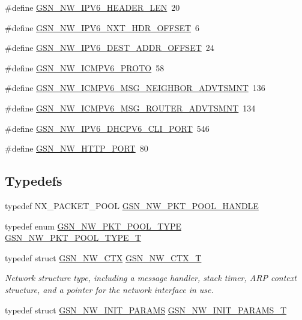 \begin{DoxyCompactItemize}
\#define \hyperlink{a00532_ad2c6776a539c7076331f15008f5a9969}{GSN\_\-NW\_\-IPV6\_\-HEADER\_\-LEN}~20
\item 
\#define \hyperlink{a00532_a0a016de722e22e498dadfba1abaa4bc3}{GSN\_\-NW\_\-IPV6\_\-NXT\_\-HDR\_\-OFFSET}~6
\item 
\#define \hyperlink{a00532_ab5593226f9c55aedd8d3c609b37fc253}{GSN\_\-NW\_\-IPV6\_\-DEST\_\-ADDR\_\-OFFSET}~24
\item 
\#define \hyperlink{a00532_aa45655995857c7f814122d96de2edf55}{GSN\_\-NW\_\-ICMPV6\_\-PROTO}~58
\item 
\#define \hyperlink{a00532_aa0aa9e2bbc754e9b936e74bf3ca029da}{GSN\_\-NW\_\-ICMPV6\_\-MSG\_\-NEIGHBOR\_\-ADVTSMNT}~136
\item 
\#define \hyperlink{a00532_a27f5c9b5b802b99a08e3e43e2714e66d}{GSN\_\-NW\_\-ICMPV6\_\-MSG\_\-ROUTER\_\-ADVTSMNT}~134
\item 
\#define \hyperlink{a00532_a331459b3ebb4da867a8ff8590ea407c4}{GSN\_\-NW\_\-IPV6\_\-DHCPV6\_\-CLI\_\-PORT}~546
\item 
\#define \hyperlink{a00532_a19fbfe0b325520621e45e19eb9aa9111}{GSN\_\-NW\_\-HTTP\_\-PORT}~80
\end{DoxyCompactItemize}
\subsection*{Typedefs}
\begin{DoxyCompactItemize}
\item 
typedef NX\_\-PACKET\_\-POOL \hyperlink{a00532_afccc5835aa5e2916600678de68186848}{GSN\_\-NW\_\-PKT\_\-POOL\_\-HANDLE}
\item 
typedef enum \hyperlink{a00532_a75dd2f792a21a6b414daffe98e4b656b}{GSN\_\-NW\_\-PKT\_\-POOL\_\-TYPE} \hyperlink{a00532_a777bb6c45bce65d3ede8311de122d451}{GSN\_\-NW\_\-PKT\_\-POOL\_\-TYPE\_\-T}
\item 
typedef struct \hyperlink{a00164}{GSN\_\-NW\_\-CTX} \hyperlink{a00670_ga086f6dd63b1ad2f2008312cc8c24b606}{GSN\_\-NW\_\-CTX\_\-T}
\begin{DoxyCompactList}\small\item\em Network structure type, including a message handler, stack timer, ARP context structure, and a pointer for the network interface in use. \end{DoxyCompactList}\item 
typedef struct \hyperlink{a00165}{GSN\_\-NW\_\-INIT\_\-PARAMS} \hyperlink{a00532_ad66a56e7fe3cb8fa6e4a36b1cc90c781}{GSN\_\-NW\_\-INIT\_\-PARAMS\_\-T}
\end{DoxyCompactItemize}
